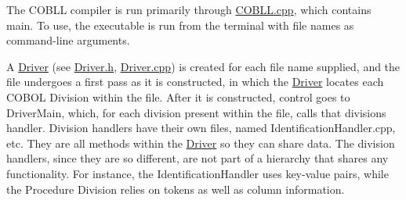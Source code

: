 The COBLL compiler is run primarily through {\ttfamily \mbox{\hyperlink{_c_o_b_l_l_8cpp}{COBLL.\+cpp}}}, which contains {\ttfamily main}. To use, the executable is run from the terminal with file names as command-\/line arguments.

A \mbox{\hyperlink{class_driver}{Driver}} (see {\ttfamily \mbox{\hyperlink{_driver_8h}{Driver.\+h}}}, {\ttfamily \mbox{\hyperlink{_driver_8cpp}{Driver.\+cpp}}}) is created for each file name supplied, and the file undergoes a first pass as it is constructed, in which the \mbox{\hyperlink{class_driver}{Driver}} locates each COBOL Division within the file. After it is constructed, control goes to {\ttfamily Driver\+Main}, which, for each division present within the file, calls that division\textquotesingle{}s handler. Division handlers have their own files, named {\ttfamily Identification\+Handler.\+cpp}, etc. They are all methods within the \mbox{\hyperlink{class_driver}{Driver}} so they can share data. The division handlers, since they are so different, are not part of a hierarchy that shares any functionality. For instance, the Identification\+Handler uses key-\/value pairs, while the Procedure Division relies on tokens as well as column information. 
